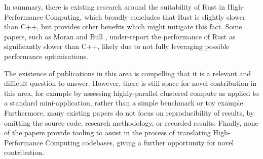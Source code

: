 In summary, there is existing research around the suitability of Rust in High-Performance Computing, which broadly concludes that Rust is slightly slower than C++, but provides other benefits which might mitigate this fact. Some papers, such as Moran and Bull \cite{moranEmergingTechnologiesRust2023}, under-report the performance of Rust as significantly slower than C++, likely due to not fully leveraging possible performance optimisations.

The existence of publications in this area is compelling that it is a relevant and difficult question to answer. However, there is still space for novel contribution in this area, for example by assessing highly-parallel clustered compute as applied to a standard mini-application, rather than a simple benchmark or toy example. Furthermore, many existing papers do not focus on reproducibility of results, by omitting the source code, research methodology, or recorded results. Finally, none of the papers provide tooling to assist in the process of translating High-Performance Computing codebases, giving a further opportunity for novel contribution.